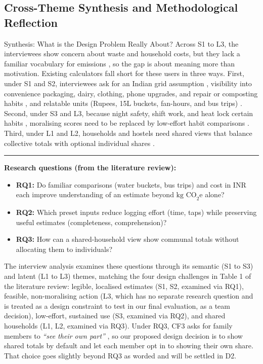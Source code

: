 \documentclass[12pt, a4paper]{article}
\begin{document}
\subsection{Cross-Theme Synthesis and Methodological Reflection}
\begin{synthesisbox}{Synthesis: What is the Design Problem Really About?}
Across S1 to L3, the interviewees show concern about waste and household costs, but they lack a familiar vocabulary for emissions \cite{gandhi2025, grinstein2018}, so the gap is about meaning more than motivation. Existing calculators fall short for these users in three ways. First, under S1 and S2, interviewees ask for an Indian grid assumption \cite{cf4}, visibility into convenience packaging, dairy, clothing, phone upgrades, and repair or composting habits \cite{cf1, cf3, cf4, cf10}, and relatable units (Rupees, 15L buckets, fan-hours, and bus trips) \cite{cf1, cf6, cf8}. Second, under S3 and L3, because night safety, shift work, and heat lock certain habits \cite{cf1, cf2, cf9}, moralising scores \cite{brynjarsdottir2012} need to be replaced by low-effort habit comparisons \cite{cf5, cf6}. Third, under L1 and L2, households and hostels need shared views that balance collective totals with optional individual shares \cite{cf1, cf3, cf7, cf10}.
\vspace{2pt}\hrule\vspace{3pt}
\textbf{Research questions (from the literature review):}
\begin{itemize}
    \item \textbf{RQ1:} Do familiar comparisons (water buckets, bus trips) and cost in INR each improve understanding of an estimate beyond $\text{kg CO}_2\text{e}$ alone?
    \item \textbf{RQ2:} Which preset inputs reduce logging effort (time, taps) while preserving useful estimates (completeness, comprehension)?
    \item \textbf{RQ3:} How can a shared-household view show communal totals without allocating them to individuals?
\end{itemize}
The interview analysis examines these questions through its semantic (S1 to S3) and latent (L1 to L3) themes, matching the four design challenges in Table 1 of the literature review: legible, localised estimates (S1, S2, examined via RQ1), feasible, non-moralising action (L3, which has no separate research question and is treated as a design constraint to test in our final evaluation, as a team decision), low-effort, sustained use (S3, examined via RQ2), and shared households (L1, L2, examined via RQ3). Under RQ3, CF3 asks for family members to \textit{``see their own part''} \cite{cf3}, so our proposed design decision is to show shared totals by default and let each member opt in to showing their own share. That choice goes slightly beyond RQ3 as worded and will be settled in D2.

\end{synthesisbox}
\end{document}
